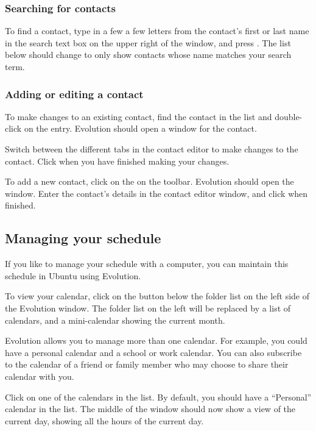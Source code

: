  \subsubsection{Searching for contacts}

To find a contact, type in a few a few letters from the contact's first or
last name in the search text box on the upper right of the window, and press
. The list below should change to only show contacts whose
name matches your search term.

 \subsubsection{Adding or editing a contact}

To make changes to an existing contact, find the contact in the list and 
double-click on the entry. Evolution should open a  
window for the contact.

Switch between the different tabs in the contact editor to make changes to the
contact. Click  when you have finished making your changes.

To add a new contact, click on the  on the toolbar. Evolution should
open the  window. Enter the contact's details in the 
contact editor window, and click  when finished.

\subsection{Managing your schedule}

If you like to manage your schedule with a computer, you can maintain this 
schedule in Ubuntu using Evolution.

To view your calendar, click on the  button below the folder
list on the left side of the Evolution window. The folder list on the left
will be replaced by a list of calendars, and a mini-calendar showing the 
current month.

Evolution allows you to manage more than one calendar. For example, you could
have a personal calendar and a school or work calendar. You can also 
subscribe to the calendar of a friend or family member who may choose to share
their calendar with you.

Click on one of the calendars in the list. By default, you should have a 
``Personal'' calendar in the list. The middle of the window should now
show a view of the current day, showing all the hours of the current day.

